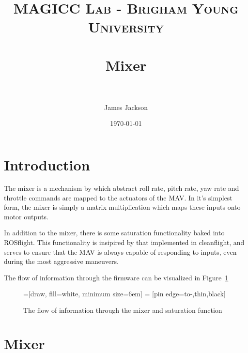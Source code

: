 \documentclass[paper=a4, fontsize=11pt]{scrartcl} %
\title{
\normalfont \normalsize
\textsc{MAGICC Lab - Brigham Young University} \\ [25pt] %
\horrule{0.5pt} \\[0.4cm] %
\huge Mixer \\ %
\horrule{2pt} \\[0.5cm] %
}
\author{James Jackson} %
\date{\normalsize\today} %
\begin{document}
\maketitle %


\section{Introduction}

The mixer is a mechanism by which abstract roll rate, pitch rate, yaw rate and throttle commands are mapped to the actuators of the MAV.  In it's simplest form, the mixer is simply a matrix multiplication which maps these inputs onto motor outputs.

In addition to the mixer, there is some saturation functionality baked into ROSflight.  This functionality is insipired by that implemented in cleanflight, and serves to ensure that the MAV is always capable of responding to inputs, even during the most aggressive maneuvers.

The flow of information through the firmware can be visualized in Figure~\ref{fig:mixer_flow}

\begin{figure}
	\centering
	=[draw, fill=white, minimum size=6em]
	 = [pin edge={to-,thin,black}]

\label{fig:mixer_flow}
\caption{The flow of information through the mixer and saturation function}
\end{figure}

\section{Mixer}
\end{document}
